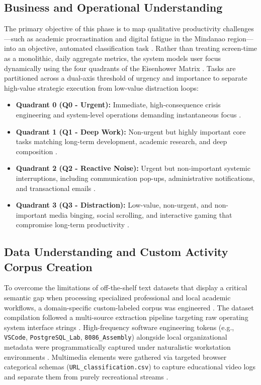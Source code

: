 \documentclass[conference]{IEEEtran}
\begin{document}
\subsection{Business and Operational Understanding}
The primary objective of this phase is to map qualitative productivity challenges—such as academic procrastination and digital fatigue in the Mindanao region—into an objective, automated classification task \cite{Tiking2024}. Rather than treating screen-time as a monolithic, daily aggregate metrics, the system models user focus dynamically using the four quadrants of the Eisenhower Matrix \cite{Covey1989}. Tasks are partitioned across a dual-axis threshold of urgency and importance to separate high-value strategic execution from low-value distraction loops:
\begin{itemize}
    \item \textbf{Quadrant 0 (Q0 - Urgent):} Immediate, high-consequence crisis engineering and system-level operations demanding instantaneous focus \cite{Covey1989}.
    \item \textbf{Quadrant 1 (Q1 - Deep Work):} Non-urgent but highly important core tasks matching long-term development, academic research, and deep composition \cite{Covey1989}.
    \item \textbf{Quadrant 2 (Q2 - Reactive Noise):} Urgent but non-important systemic interruptions, including communication pop-ups, administrative notifications, and transactional emails \cite{Covey1989}.
    \item \textbf{Quadrant 3 (Q3 - Distraction):} Low-value, non-urgent, and non-important media binging, social scrolling, and interactive gaming that compromise long-term productivity \cite{Covey1989}.
\end{itemize}

\subsection{Data Understanding and Custom Activity Corpus Creation}
To overcome the limitations of off-the-shelf text datasets that display a critical semantic gap when processing specialized professional and local academic workflows, a domain-specific custom-labeled corpus was engineered \cite{Murrar2025}. The dataset compilation followed a multi-source extraction pipeline targeting raw operating system interface strings \cite{Allam2025}. High-frequency software engineering tokens (e.g., \texttt{VSCode}, \texttt{PostgreSQL\_Lab}, \texttt{8086\_Assembly}) alongside local organizational metadata were programmatically captured under naturalistic workstation environments \cite{Murrar2025}. Multimedia elements were gathered via targeted browser categorical schemas (\texttt{URL\_classification.csv}) to capture educational video logs and separate them from purely recreational streams \cite{Sitaula2022}. 
\end{document}
